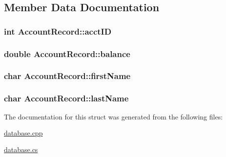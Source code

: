 \subsection{\-Member \-Data \-Documentation}
\hypertarget{struct_account_record_a587aa92adcd387d37427cd19c69e5932}{
\subsubsection[{acct\-I\-D}]{\setlength{\rightskip}{0pt plus 5cm}int {\bf \-Account\-Record\-::acct\-I\-D}}}\label{struct_account_record_a587aa92adcd387d37427cd19c69e5932}
\hypertarget{struct_account_record_a7de857c68a45702a0c1c4720b4570c2a}{
\subsubsection[{balance}]{\setlength{\rightskip}{0pt plus 5cm}double {\bf \-Account\-Record\-::balance}}}\label{struct_account_record_a7de857c68a45702a0c1c4720b4570c2a}
\hypertarget{struct_account_record_a4ba463ed92b46c3ec07f7904001c57e2}{
\subsubsection[{first\-Name}]{\setlength{\rightskip}{0pt plus 5cm}char {\bf \-Account\-Record\-::first\-Name}}}\label{struct_account_record_a4ba463ed92b46c3ec07f7904001c57e2}
\hypertarget{struct_account_record_a1d0fe60d57c25aec63b4b2b8008c1fcc}{
\subsubsection[{last\-Name}]{\setlength{\rightskip}{0pt plus 5cm}char {\bf \-Account\-Record\-::last\-Name}}}\label{struct_account_record_a1d0fe60d57c25aec63b4b2b8008c1fcc}


\-The documentation for this struct was generated from the following files\-:\begin{DoxyCompactItemize}
\item 
\hyperlink{database_8cpp}{database.\-cpp}\item 
\hyperlink{database_8cs}{database.\-cs}\end{DoxyCompactItemize}
